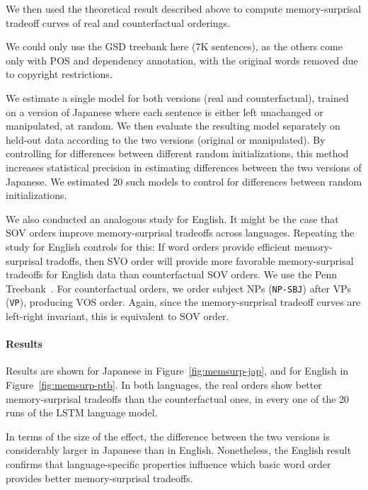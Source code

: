 \documentclass[11pt,a4paper]{article}
\begin{document}
We then used the theoretical result described above to compute memory-surprisal tradeoff curves of real and counterfactual orderings.

We could only use the GSD treebank here (7K sentences), as the others come only with POS and dependency annotation, with the original words removed due to copyright restrictions.

We estimate a single model for both versions (real and counterfactual), trained on a version of Japanese where each sentence is either left unachanged or manipulated, at random.
We then evaluate the resulting model separately on held-out data according to the two versions (original or manipulated).
By controlling for differences between different random initializations, this method increases statistical precision in estimating differences between the two versions of Japanese.
We estimated 20 such models to control for differences between random initializations.

We also conducted an analogous study for English.
It might be the case that SOV orders improve memory-surprisal tradeoffs across languages.
Repeating the study for English controls for this:
If word orders provide efficient memory-surprisal tradoffs, then SVO order will provide more favorable memory-surprisal tradeoffs for English data than counterfactual SOV orders.
We use the Penn Treebank~\citep{marcus-building-1993}.
For counterfactual orders, we order subject NPs (\texttt{NP-SBJ}) after VPs (\texttt{VP}), producing VOS order.
Again, since the memory-surprisal tradeoff curves are left-right invariant, this is equivalent to SOV order.


\paragraph{Results}

Results are shown for Japanese in Figure~\ref{fig:memsurp-jap}, and for English in Figure~\ref{fig:memsurp-ptb}.
In both languages, the real orders show better memory-surprisal tradeoffs than the counterfactual ones, in every one of the 20 runs of the LSTM language model.

In terms of the size of the effect, the difference between the two versions is considerably larger in Japanese than in English.
Nonetheless, the English result confirms that language-specific properties influence which basic word order provides better memory-surprisal tradeoffs.
\end{document}
